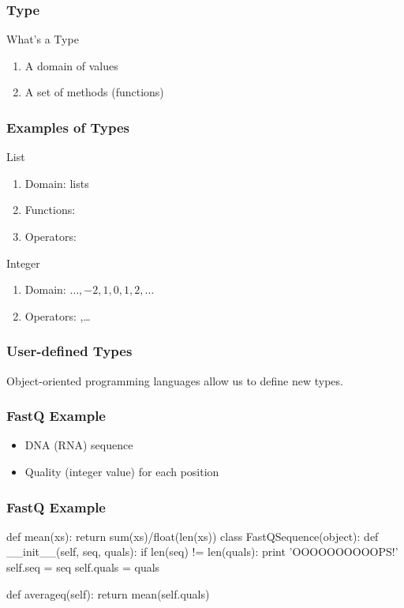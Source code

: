 \begin{frame}[fragile]
\frametitle{Type}
\begin{block}{What's a Type}
\begin{enumerate}
\item A domain of values
\item A set of methods (functions)
\end{enumerate}
\end{block}

\end{frame}

\begin{frame}[fragile]
\frametitle{Examples of Types}

\begin{block}{List}
\begin{enumerate}
\item Domain: lists
\item Functions: 
\item Operators: 
\end{enumerate}
\end{block}

\pause
\begin{block}{Integer}
\begin{enumerate}
\item Domain: $\dots,-2, 1, 0, 1, 2, \dots$
\item Operators: ,\ldots
\end{enumerate}
\end{block}
\end{frame}

\begin{frame}[fragile]
\frametitle{User-defined Types}

Object-oriented programming languages allow us to define new types.

\end{frame}

\begin{frame}[fragile]
\frametitle{FastQ Example}

\begin{itemize}
\item DNA (RNA) sequence
\item Quality (integer value) for each position
\end{itemize}

\end{frame}


\begin{frame}[fragile]
\frametitle{FastQ Example}

\begin{python}
def mean(xs):
    return sum(xs)/float(len(xs))
class FastQSequence(object):
    def __init__(self, seq, quals):
        if len(seq) != len(quals):
            print 'OOOOOOOOOOPS!'
        self.seq = seq
        self.quals = quals

    def averageq(self):
        return mean(self.quals)
\end{python}

\end{frame}

